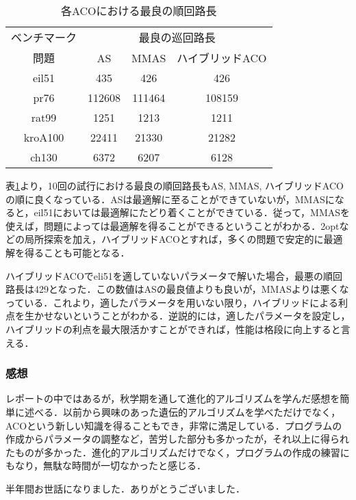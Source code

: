 \documentclass[a4j]{jsarticle}
\begin{document}
\begin{table}[htb]
 \begin{center}
  \caption{各ACOにおける最良の順回路長}
  \label{best}
  \begin{tabular}[tb]{|c||c|c|c|} \hline
 ベンチマーク& \multicolumn{3}{|c|}{最良の巡回路長} \\\cline{2-4}
問題 & AS & MMAS & ハイブリッドACO \\\hline
eil51 & 435 & 426 & 426 \\\hline
pr76 & 112608 & 111464 & 108159 \\\hline
rat99 & 1251 & 1213 & 1211 \\\hline
kroA100 & 22411 & 21330 & 21282 \\\hline
ch130 & 6372 & 6207 & 6128 \\\hline
  \end{tabular}
 \end{center}
\end{table}

\par
表\ref{best}より，10回の試行における最良の順回路長もAS, MMAS, ハイブリッドACOの順に良くなっている．ASは最適解に至ることができていないが，MMASになると，eil51においては最適解にたどり着くことができている．従って，MMASを使えば，問題によっては最適解を得ることができるということがわかる．2optなどの局所探索を加え，ハイブリッドACOとすれば，多くの問題で安定的に最適解を得ることも可能となる．
\par
ハイブリッドACOでeli51を適していないパラメータで解いた場合，最悪の順回路長は429となった．この数値はASの最良値よりも良いが，MMASよりは悪くなっている．これより，適したパラメータを用いない限り，ハイブリッドによる利点を生かせないということがわかる．逆説的には，適したパラメータを設定し，ハイブリッドの利点を最大限活かすことができれば，性能は格段に向上すると言える．

\subsubsection*{感想}
レポートの中ではあるが，秋学期を通して進化的アルゴリズムを学んだ感想を簡単に述べる．以前から興味のあった遺伝的アルゴリズムを学べただけでなく，ACOという新しい知識を得ることもでき，非常に満足している．プログラムの作成からパラメータの調整など，苦労した部分も多かったが，それ以上に得られたものが多かった．進化的アルゴリズムだけでなく，プログラムの作成の練習にもなり，無駄な時間が一切なかったと感じる．
\par
半年間お世話になりました．ありがとうございました．
\end{document}

